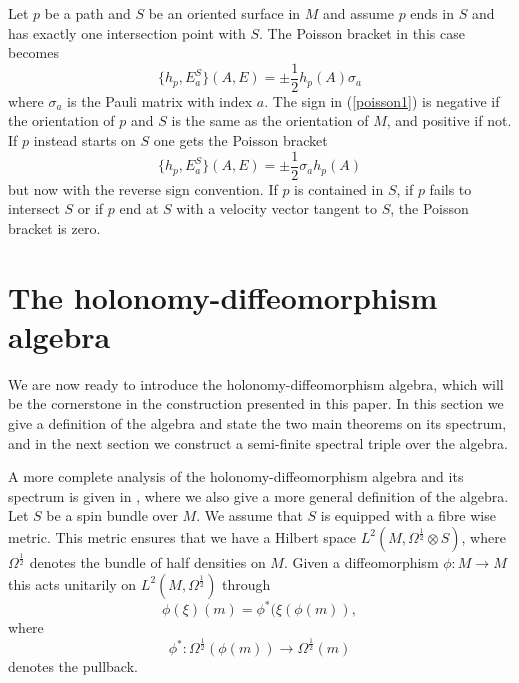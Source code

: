 \documentclass[12pt]{article}
\begin{document}
Let $p$ be a path and $S$ be an oriented surface in $M$ and assume $p$ ends in $S$ and has exactly one intersection point with $S$. The Poisson bracket in this case becomes 
\begin{equation}
\{ h_p, E^S_a \}(A,E)=\pm \frac{1}{2} h_p(A)\sigma_a 
\label{poisson1}
\end{equation} 
where $\sigma_a$ is the Pauli matrix with index $a$. The sign in (\ref{poisson1}) is negative if the orientation of $p$ and $S$ is the same as the orientation of $M$, and positive if not. If $p$ instead starts on $S$ one gets the Poisson bracket
\begin{equation}
\{ h_p, E^S_a \}(A,E)=\pm \frac{1}{2}\sigma_a h_p(A) \label{poisson2}
\end{equation}
but now with the reverse sign convention.
If $p$ is contained in $S$,  if $p$ fails to intersect $S$ or if $p$ end at $S$ with a velocity vector tangent to $S$, the Poisson bracket is zero.








\section{The holonomy-diffeomorphism algebra}

We are now ready to introduce the holonomy-diffeomorphism algebra, which will be the cornerstone in the construction presented in this paper. In this section we give a definition of the algebra and state the two main theorems on its spectrum, and in the next section we construct a semi-finite spectral triple over the algebra.



A more complete analysis of the holonomy-diffeomorphism algebra and its spectrum is given in \cite{AGnew}, where we also give a more general definition of the algebra.\\ %


Let $S$ be a spin bundle over $M$. We assume that $S$ is equipped with a fibre wise metric. This metric ensures that we have a Hilbert space $L^2 (M , \Omega^{\frac12} \otimes S)$, where $\Omega^{\frac12}$ denotes the bundle of half densities on $M$. Given a diffeomorphism $\phi: M\to M$ this acts unitarily on  $L^2 (M , \Omega^{\frac12} )$ through
$$ \phi (\xi)(m)= \phi^*(\xi (\phi (m) )  , $$
where 
$$\phi^* :\Omega^{\frac12} (\phi (m)) \to \Omega^{\frac12} (m)  $$
denotes the pullback.
\end{document}
